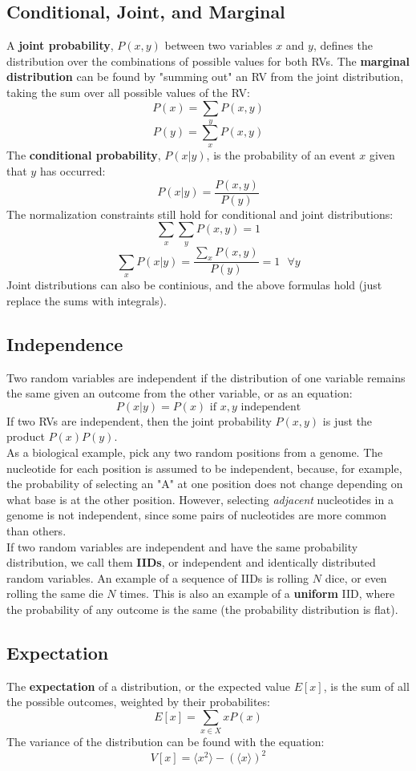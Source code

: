 \documentclass[12pt]{article}
\begin{document}
\subsection{Conditional, Joint, and Marginal}
A \textbf{joint probability}, $P(x, y)$ between two variables $x$ and $y$, defines the distribution over the combinations of possible values for both RVs. The \textbf{marginal distribution} can be found by "summing out" an RV from the joint distribution, taking the sum over all possible values of the RV:
$$P(x) = \sum_yP(x,y)$$
$$P(y) = \sum_xP(x,y)$$
The \textbf{conditional probability}, $P(x|y)$, is the probability of an event $x$ given that $y$ has occurred:
$$P(x|y) = \frac{P(x,y)}{P(y)}$$
The normalization constraints still hold for conditional and joint distributions:
$$\sum_x\sum_yP(x,y) = 1$$
$$\sum_xP(x|y) = \frac{\sum_xP(x,y)}{P(y)} = 1\text{  }\forall y$$
Joint distributions can also be continious, and the above formulas hold (just replace the sums with integrals).
\subsection{Independence}
Two random variables are independent if the distribution of one variable remains the same given an outcome from the other variable, or as an equation:
$$P(x|y) = P(x) \text{ if }x,y\text{ independent}$$
If two RVs are independent, then the joint probability $P(x,y)$ is just the product $P(x)P(y)$.\\[10pt]
As a biological example, pick any two random positions from a genome. The nucleotide for each position is assumed to be independent, because, for example, the probability of selecting an "A" at one position does not change depending on what base is at the other position. However, selecting \textit{adjacent} nucleotides in a genome is not independent, since some pairs of nucleotides are more common than others.\\[10pt]
If two random variables are independent and have the same probability distribution, we call them \textbf{IIDs}, or independent and identically distributed random variables. An example of a sequence of IIDs is rolling $N$ dice, or even rolling the same die $N$ times. This is also an example of a \textbf{uniform} IID, where the probability of any outcome is the same (the probability distribution is flat).
\subsection{Expectation}
The \textbf{expectation} of a distribution, or the expected value $E[x]$, is the sum of all the possible outcomes, weighted by their probabilites:
$$E[x] = \sum_{x\in X}xP(x)$$
The variance of the distribution can be found with the equation:
$$V[x] = \langle x^2\rangle-(\langle x\rangle)^2$$
\end{document}

